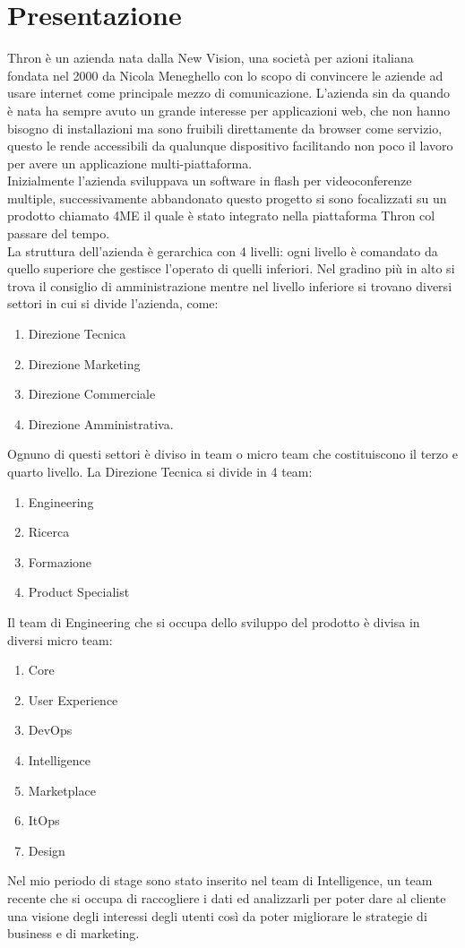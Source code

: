 \documentclass[a4paper, 12pt, twoside, openright]{book}
\begin{document}
\section{Presentazione}
\thispagestyle{empty}
Thron è un azienda nata dalla New Vision, una società per azioni italiana fondata nel 2000 da Nicola Meneghello con lo scopo di convincere le aziende ad usare internet come principale mezzo di comunicazione. L'azienda sin da quando è nata ha sempre avuto un grande interesse per applicazioni web, che non hanno bisogno di installazioni ma sono fruibili direttamente da browser come servizio, questo le rende accessibili da qualunque dispositivo facilitando non poco il lavoro per avere un applicazione multi-piattaforma.\\
Inizialmente l'azienda sviluppava un software in flash per videoconferenze multiple, successivamente abbandonato questo progetto si sono focalizzati su un prodotto chiamato 4ME il quale è stato integrato nella piattaforma Thron col passare del tempo.\\
La struttura dell'azienda è gerarchica con 4 livelli: ogni livello è comandato da quello superiore che gestisce l'operato di quelli inferiori. Nel gradino più in alto si trova il consiglio di amministrazione mentre nel livello inferiore si trovano diversi settori in cui si divide l'azienda, come:
\begin{enumerate}
\item Direzione Tecnica
\item Direzione Marketing
\item Direzione Commerciale
\item Direzione Amministrativa.
\end{enumerate}
Ognuno di questi settori è diviso in team o micro team che costituiscono il terzo e quarto livello. La Direzione Tecnica si divide in 4 team:
\begin{enumerate}
\item Engineering
\item Ricerca
\item Formazione
\item Product Specialist
\end{enumerate}
Il team di Engineering che si occupa dello sviluppo del prodotto è divisa in diversi micro team:
\begin{enumerate}
\item Core
\item User Experience
\item DevOps
\item Intelligence
\item Marketplace
\item ItOps
\item Design
\end{enumerate}
Nel mio periodo di stage sono stato inserito nel team di Intelligence, un team recente che si occupa di raccogliere i dati ed analizzarli per poter dare al cliente una visione degli interessi degli utenti così da poter migliorare le strategie di business e di marketing.
\end{document}
